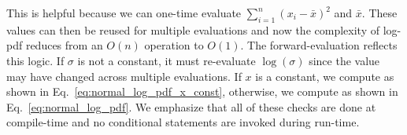 This is helpful because we can one-time evaluate $\sum\limits_{i=1}^n (x_i - \bar{x})^2$ and $\bar{x}$.
These values can then be reused for multiple evaluations and now the complexity of log-pdf
reduces from an $O(n)$ operation to $O(1)$.
The forward-evaluation reflects this logic.
If $\sigma$ is not a constant, it must re-evaluate $\log(\sigma)$ 
since the value may have changed across multiple evaluations.
If $x$ is a constant, we compute as shown in Eq.~\ref{eq:normal_log_pdf_x_const},
otherwise, we compute as shown in Eq.~\ref{eq:normal_log_pdf}.
We emphasize that all of these checks are done at compile-time 
and no conditional statements are invoked during run-time.
